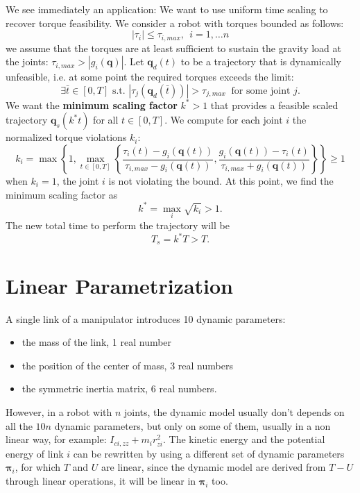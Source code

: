 \documentclass[10pt, a4paper]{report}
\newcommand{\q}{{\mathbf q}}
\begin{document}
We see immediately an application: We want to use uniform time scaling to recover torque feasibility. We consider a robot with torques bounded as follows:\begin{equation}
    |\tau_i|\le \tau_{i,max}, \ \ i=1,\dots n
\end{equation}
we assume that the torques are at least sufficient to sustain the gravity load at the joints: $\tau_{i,max}>|g_i(\q)|$. Let $\q_d(t)$ to be a trajectory that is dynamically unfeasible, i.e. at some point the required torques exceeds the limit:\begin{equation}
    \exists \bar t \in [0,T] \text{ s.t. }|\tau_j(\q_d(\bar t))|> \tau_{j,max} \ \text{ for some joint } j.
\end{equation}
We want the \textbf{minimum scaling factor} $k^*>1$ that provides a feasible scaled trajectory $\q_s(k^*t)$ for all $t\in [0,T]$. We compute for each joint $i$ the normalized torque violations $k_i$:\begin{equation}
    k_i=\max\left\{
      1, \displaystyle\max_{t\in [0,T]} \left\{ 
        \frac{\tau_i(t)-g_i(\q(t))}{\tau_{i,max}-g_i(\q(t))}, 
        \frac{g_i(\q(t))-\tau_i(t)}{\tau_{i,max}+g_i(\q(t))}
      \right\}
    \right\}\ge 1
\end{equation}
when $k_i=1$, the joint $i$ is not violating the bound. At this point, we find the minimum scaling factor as\begin{equation}
    k^*=\max_i \sqrt{k_i}>1.
\end{equation}
The new total time to perform the trajectory will be\begin{equation}
    T_s=k^*T>T.
\end{equation}
\section{Linear Parametrization}
A single link of a manipulator introduces 10 dynamic parameters:\begin{itemize}
    \item the mass of the link, 1 real number
    \item the position of the center of mass, 3 real numbers
    \item the symmetric inertia matrix, 6 real numbers.
\end{itemize}
However, in a robot with $n$ joints, the dynamic model usually don't depends on all the $10n$ dynamic parameters, but only on some of them, usually in a non linear way, for example: $I_{ci,zz}+m_ir_{zi}^2$. The kinetic energy and the potential energy of link $i$ can be rewritten by using a different set of dynamic parameters $\boldsymbol{\pi}_i$, for which $T$ and $U$ are linear, since the dynamic model are derived from $T-U$ through linear operations, it will be linear in $\boldsymbol{\pi}_i$ too.
\end{document}
